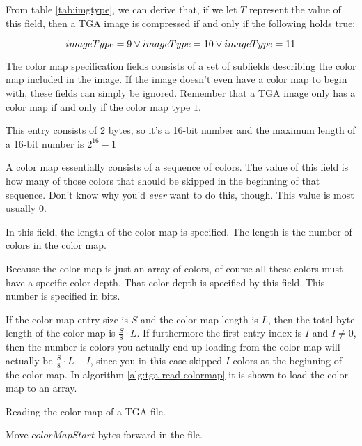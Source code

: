 From table \ref{tab:imgtype}, we can derive that, if we let $T$
represent the value of this field, then a TGA image is compressed if
and only if the following holds true:

\begin{equation*}
  imageType = 9 \vee imageType = 10 \vee imageType = 11
\end{equation*}


The color map specification fields consists of a set of subfields
describing the color map included in the image. If the image doesn't
even have a color map to begin with, these fields can simply be
ignored. Remember that a TGA image only has a color map if and only if
the color map type $1$.


This entry consists of 2 bytes, so it's a 16-bit number and the
maximum length of a 16-bit number is $2^{16} - 1$

A color map essentially consists of a sequence of colors. The value
of this field is how many of those colors that should be skipped in
the beginning of that sequence. Don't know why you'd \textit{ever}
want to do this, though. This value is most usually $0$.


In this field, the length of the color map is specified. The
length is the number of colors in the color map.


Because the color map is just an array of colors, of course all
these colors must have a specific color depth. That color depth is
specified by this field. This number is specified in bits.

If the color map entry size is $S$ and the color map length is $L$,
then the total byte length of the color map is $\frac{S}{8} \cdot
L$. If furthermore the first entry index is $I$ and $I \neq 0$, then
the number is colors you actually end up loading from the color map
will actually be $\frac{S}{8} \cdot L - I$, since you in this case
skipped $I$ colors at the beginning of the color map. In algorithm
\ref{alg:tga-read-colormap} it is shown to load the color map to an
array.

\begin{algorithm}[H]
  \caption{Reading the color map of a TGA file.}
  \label{alg:tga-read-colormap}
  \begin{algorithmic}[1]

    \State Move $colorMapStart$ bytes forward in the file.

    \EndFor
    \end{algorithmic}
  \end{algorithm}

